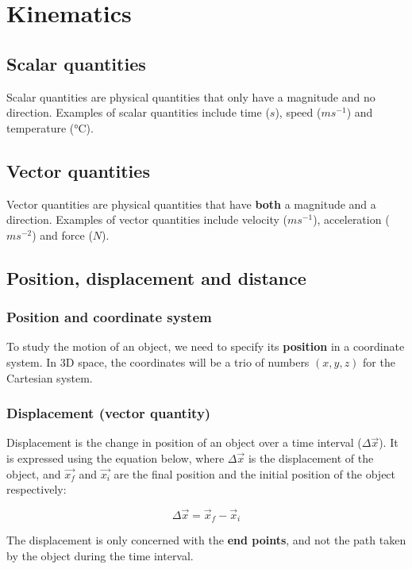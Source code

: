 \documentclass[11pt]{article}
\begin{document}
\section{Kinematics}
\label{sec:orgddb2dbe}

\subsection{Scalar quantities}
\label{sec:orgc96812c}
Scalar quantities are physical quantities that only have a magnitude and no direction. Examples of scalar quantities include time (\(\si{s}\)), speed (\(\si{ms^{-1}}\)) and temperature (\(\si{\celsius}\)).
\subsection{Vector quantities}
\label{sec:org1c5a12c}
Vector quantities are physical quantities that have \textbf{both} a magnitude and a direction. Examples of vector quantities include velocity (\(\si{ms^{-1}}\)), acceleration (\(\si{ms^{-2}}\)) and force (\(\si{N}\)).
\subsection{Position, displacement and distance}
\label{sec:org3847625}

\subsubsection{Position and coordinate system}
\label{sec:orgc431097}
To study the motion of an object, we need to specify its \textbf{position} in a coordinate system. In 3D space, the coordinates will be a trio of numbers \((x, y, z)\) for the Cartesian system.
\subsubsection{Displacement (vector quantity)}
\label{sec:orgc224544}
Displacement is the change in position of an object over a time interval (\(\Delta \vec{x}\)). It is expressed using the equation below, where \(\Delta \vec{x}\) is the displacement of the object, and \(\vec{x_f}\) and \(\vec{x_i}\) are the final position and the initial position of the object respectively:

\[\Delta \vec{x} = \vec{x}_f - \vec{x}_i\]

The displacement is only concerned with the \textbf{end points}, and not the path taken by the object during the time interval.
\end{document}
